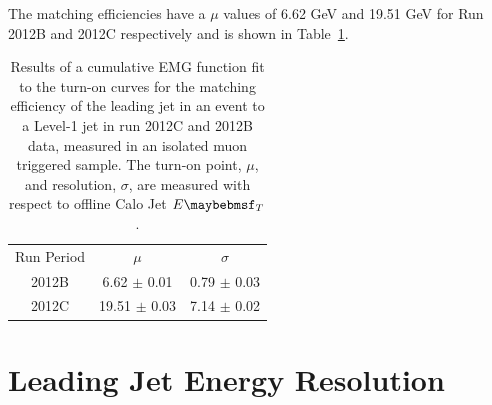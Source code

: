 The matching efficiencies have a $\mu$ values of 6.62 GeV and 19.51 GeV for Run 2012B and 2012C respectively and is shown in Table~\ref{tab:matcheff}. 

\begin{table}
\begin{center}
\begin{tabular*}{0.5\textwidth}{|c|c|c|}
\cline{1-3}
Run Period & $\mu$ & $\sigma$ \\ \cline {1-3}
2012B & 6.62 $\pm$ 0.01 & 0.79 $\pm$ 0.03  \\ \cline{1-3}
2012C & 19.51 $\pm$ 0.03 & 7.14 $\pm$ 0.02 \\ \cline{1-3}
\end{tabular*}
\caption[Results of a cumulative EMG function fit to the turn-on
curves for the matching efficiency of the leading jet in an event to
a Level-1 jet in run 2012C and 2012B data.]{Results of a cumulative EMG function fit to the turn-on
curves for the matching efficiency of the leading jet in an event to
a Level-1 jet in run 2012C and 2012B data, measured in an isolated
muon triggered sample. The turn-on point, $\mu$, and resolution, $\sigma$, are measured with respect to offline Calo Jet $\et$.} \label{tab:matcheff}
\end{center}
\end{table}

\section{Leading Jet Energy Resolution}
\label{app:jetpuresolution}

\begin{figure}[htp]

    \centering
    \,
\end{figure}

